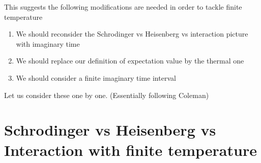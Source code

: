 This suggests the following modifications are needed in order to tackle finite temperature
\begin{enumerate}
    \item We should reconsider the Schrodinger vs Heisenberg vs interaction picture with imaginary time
    \item We should replace our definition of expectation value by the thermal one
    \item We should consider a finite imaginary time interval
\end{enumerate}

Let us consider these one by one. (Essentially following Coleman)

\section{Schrodinger vs Heisenberg vs Interaction with finite temperature}

